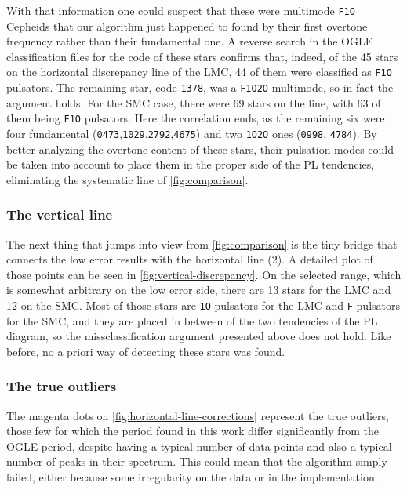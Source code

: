 With that information one could suspect that these were multimode \texttt{F1O} Cepheids 
that our algorithm just happened to found by their first overtone frequency rather than their fundamental one.
A reverse search in the OGLE classification files for the code of these stars confirms that, indeed, 
of the 45 stars on the horizontal discrepancy line of the LMC, 44 of them were classified as \texttt{F1O} pulsators.
The remaining star, code \texttt{1378}, was a \texttt{F1O2O} multimode, so in fact the argument holds.
For the SMC case, there were 69 stars on the line, with 63 of them being \texttt{F1O} pulsators.
Here the correlation ends, as the remaining six were four fundamental (\texttt{0473},\texttt{1029},\texttt{2792},\texttt{4675}) 
and two \texttt{1O2O} ones (\texttt{0998}, \texttt{4784}).
By better analyzing the overtone content of these stars, 
their pulsation modes could be taken into account to place them in the proper side of the PL tendencies,
eliminating the systematic line of \autoref{fig:comparison}.

\subsubsection{The vertical line}

The next thing that jumps into view from \autoref{fig:comparison} is the tiny bridge 
that connects the low error results with the horizontal line (2).
A detailed plot of those points can be seen in \autoref{fig:vertical-discrepancy}. 
On the selected range, which is somewhat arbitrary on the low error side, there are 13 stars for the LMC and 12 on the SMC.
Most of those stars are \texttt{1O} pulsators for the LMC and \texttt{F} pulsators for the SMC, 
and they are placed in between of the two tendencies of the PL diagram, so the missclassification argument presented above does not hold.
Like before, no a priori way of detecting these stars was found.

\subsubsection{The true outliers}

The magenta dots on \autoref{fig:horizontal-line-corrections} represent the true outliers, 
those few for which the period found in this work differ significantly from the OGLE period,
despite having a typical number of data points and also a typical number of peaks in their spectrum.
This could mean that the algorithm simply failed, either because some irregularity on the data or in the implementation. 

